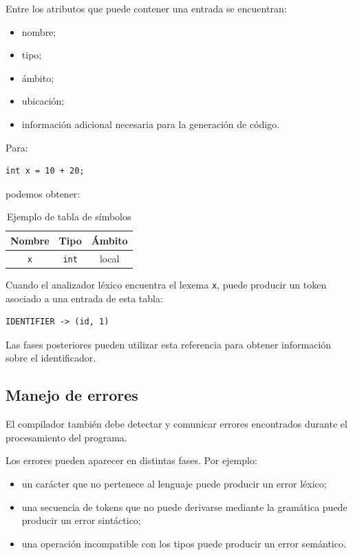 \documentclass[11pt,a4paper]{article}
\begin{document}
Entre los atributos que puede contener una entrada se encuentran:

\begin{itemize}
    \item nombre;
    \item tipo;
    \item ámbito;
    \item ubicación;
    \item información adicional necesaria para la generación de código.
\end{itemize}

Para:

\begin{lstlisting}
int x = 10 + 20;
\end{lstlisting}

podemos obtener:

\begin{table}[H]
\centering
\begin{tabular}{ccc}
\toprule
\textbf{Nombre} & \textbf{Tipo} & \textbf{Ámbito} \\
\midrule
\texttt{x} & \texttt{int} & local \\
\bottomrule
\end{tabular}
\caption{Ejemplo de tabla de símbolos}
\label{tab:symbol-table}
\end{table}

Cuando el analizador léxico encuentra el lexema \texttt{x}, puede producir
un token asociado a una entrada de esta tabla:

\begin{lstlisting}
IDENTIFIER -> (id, 1)
\end{lstlisting}

Las fases posteriores pueden utilizar esta referencia para obtener
información sobre el identificador.

\subsection{Manejo de errores}

El compilador también debe detectar y comunicar errores encontrados durante
el procesamiento del programa.

Los errores pueden aparecer en distintas fases. Por ejemplo:

\begin{itemize}
    \item un carácter que no pertenece al lenguaje puede producir un error
    léxico;
    \item una secuencia de tokens que no puede derivarse mediante la
    gramática puede producir un error sintáctico;
    \item una operación incompatible con los tipos puede producir un error
    semántico.
\end{itemize}
\end{document}
